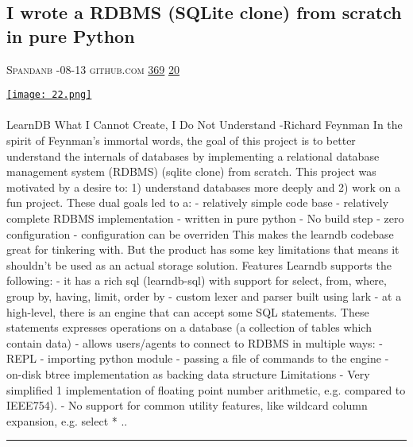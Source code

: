 \documentclass[10pt,a4paper]{article}
\begin{document}
\begin{multicols*}{2}
\begin{minipage}{\linewidth}
\subsection{I wrote a RDBMS (SQLite clone) from scratch in pure Python}
\textsc{\footnotesize
{\scriptsize\faUser}\space 
Spandanb 
{\scriptsize\faCalendar}-08-13 
{\scriptsize\faGithub}\space 
github.com 
{\scriptsize\faThumbsOUp}\space 
\href{http://news.ycombinator.com/item?id=37114141\&utm\_term=comment}{369} 
{\scriptsize\faComments}\space 
\href{http://news.ycombinator.com/item?id=37114141\&utm\_term=comment}{20} 
}
\par\medskip\noindent
\href{https://github.com/spandanb/learndb-py?utm\_source=hackernewsletter\&utm\_medium=email\&utm\_term=code}{
    \texttt{[image: 22.png]}
}
\end{minipage}
\paragraph{}
LearnDB
What I Cannot Create, I Do Not Understand -Richard Feynman
In the spirit of Feynman's immortal words, the goal of this project is to better understand the internals of databases by implementing a relational database management system (RDBMS) (sqlite clone) from scratch.
This project was motivated by a desire to: 1) understand databases more deeply and 2) work on a fun project. These dual goals led to a:
- relatively simple code base
- relatively complete RDBMS implementation
- written in pure python
- No build step
- zero configuration
- configuration can be overriden
This makes the learndb codebase great for tinkering with. But the product has some key limitations that means it shouldn't be used as an actual storage solution.
Features
Learndb supports the following:
- it has a rich sql (learndb-sql) with support for
select, from, where, group by, having, limit, order by
- custom lexer and parser built using
lark
- at a high-level, there is an engine that can accept some SQL statements. These statements expresses operations on a database (a collection of tables which contain data)
- allows users/agents to connect to RDBMS in multiple ways:
- REPL
- importing python module
- passing a file of commands to the engine
- on-disk btree implementation as backing data structure
Limitations
- Very simplified 1 implementation of floating point number arithmetic, e.g. compared to IEEE754).
- No support for common utility features, like wildcard column expansion, e.g.
select * ..
\par\noindent\textcolor{red}{\rule{\linewidth}{0.2mm}}
\vfill
\null
\noindent\begin{minipage}{\linewidth}

\end{minipage}
\end{multicols*}
\end{document}

